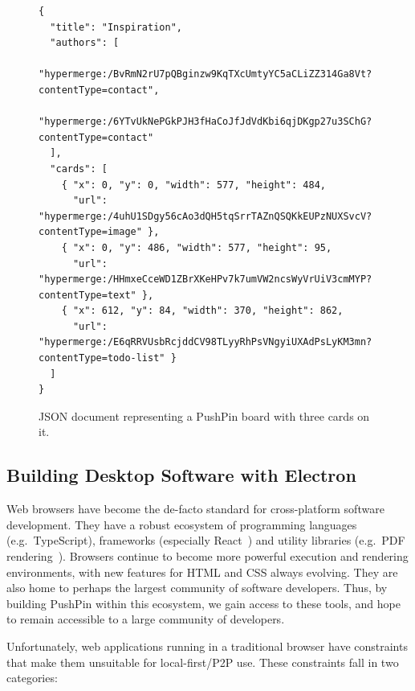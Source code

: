 \documentclass[sigplan,10pt]{acmart}
\begin{document}
\begin{figure}
\begin{verbatim}
{
  "title": "Inspiration",
  "authors": [
    "hypermerge:/BvRmN2rU7pQBginzw9KqTXcUmtyYC5aCLiZZ314Ga8Vt?contentType=contact",
    "hypermerge:/6YTvUkNePGkPJH3fHaCoJfJdVdKbi6qjDKgp27u3SChG?contentType=contact"
  ],
  "cards": [
    { "x": 0, "y": 0, "width": 577, "height": 484,
      "url": "hypermerge:/4uhU1SDgy56cAo3dQH5tqSrrTAZnQSQKkEUPzNUXSvcV?contentType=image" },
    { "x": 0, "y": 486, "width": 577, "height": 95,
      "url": "hypermerge:/HHmxeCceWD1ZBrXKeHPv7k7umVW2ncsWyVrUiV3cmMYP?contentType=text" },
    { "x": 612, "y": 84, "width": 370, "height": 862,
      "url": "hypermerge:/E6qRRVUsbRcjddCV98TLyyRhPsVNgyiUXAdPsLyKM3mn?contentType=todo-list" }
  ]
}
\end{verbatim}
\caption{JSON document representing a PushPin board with three cards on it.}
\label{fig:board-json}
\end{figure}

\subsection{Building Desktop Software with Electron}

Web browsers have become the de-facto standard for cross-platform software development. They have a robust ecosystem of programming languages (e.g.\ TypeScript), frameworks (especially React~\cite{React}) and utility libraries (e.g.\ PDF rendering~\cite{PDFjs}). Browsers continue to become more powerful execution and rendering environments, with new features for HTML and CSS always evolving. They are also home to perhaps the largest community of software developers. Thus, by building PushPin within this ecosystem, we gain access to these tools, and hope to remain accessible to a large community of developers.

Unfortunately, web applications running in a traditional browser have constraints that make them unsuitable for local-first/P2P use. These constraints fall in two categories:
\end{document}
